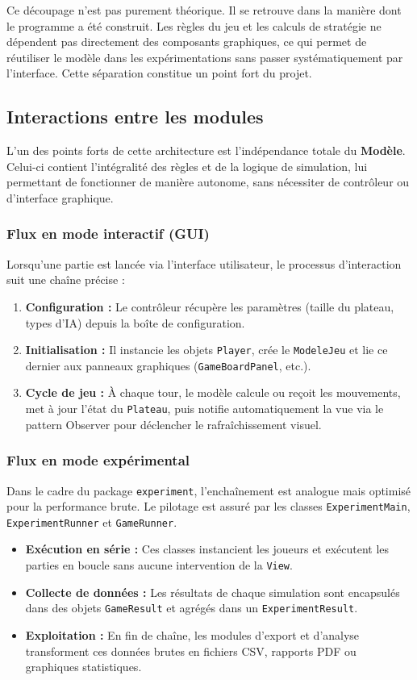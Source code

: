 \documentclass[11pt,a4paper]{article}
\begin{document}
Ce découpage n'est pas purement théorique. Il se retrouve dans la manière dont le programme a été construit. Les règles du jeu et les calculs de stratégie ne dépendent pas directement des composants graphiques, ce qui permet de réutiliser le modèle dans les expérimentations sans passer systématiquement par l'interface. Cette séparation constitue un point fort du projet.


\subsection{Interactions entre les modules}

L'un des points forts de cette architecture est l'indépendance totale du \textbf{Modèle}. Celui-ci contient l'intégralité des règles et de la logique de simulation, lui permettant de fonctionner de manière autonome, sans nécessiter de contrôleur ou d'interface graphique.

\subsubsection{Flux en mode interactif (GUI)}
Lorsqu'une partie est lancée via l'interface utilisateur, le processus d'interaction suit une chaîne précise :
\begin{enumerate}
    \item \textbf{Configuration :} Le contrôleur récupère les paramètres (taille du plateau, types d'IA) depuis la boîte de configuration.
    \item \textbf{Initialisation :} Il instancie les objets \texttt{Player}, crée le \texttt{ModeleJeu} et lie ce dernier aux panneaux graphiques (\texttt{GameBoardPanel}, etc.).
    \item \textbf{Cycle de jeu :} À chaque tour, le modèle calcule ou reçoit les mouvements, met à jour l'état du \texttt{Plateau}, puis notifie automatiquement la vue via le pattern Observer pour déclencher le rafraîchissement visuel.
\end{enumerate}


\subsubsection{Flux en mode expérimental}
Dans le cadre du package \texttt{experiment}, l'enchaînement est analogue mais optimisé pour la performance brute. Le pilotage est assuré par les classes \texttt{ExperimentMain}, \texttt{ExperimentRunner} et \texttt{GameRunner}. 
\begin{itemize}
    \item \textbf{Exécution en série :} Ces classes instancient les joueurs et exécutent les parties en boucle sans aucune intervention de la \texttt{View}.
    \item \textbf{Collecte de données :} Les résultats de chaque simulation sont encapsulés dans des objets \texttt{GameResult} et agrégés dans un \texttt{ExperimentResult}.
    \item \textbf{Exploitation :} En fin de chaîne, les modules d'export et d'analyse transforment ces données brutes en fichiers CSV, rapports PDF ou graphiques statistiques.
\end{itemize}
\end{document}
